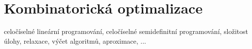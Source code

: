 \chapter{Kombinatorická optimalizace}

celočíselné lineární programování, celočíselné semidefinitní programování, složitost úlohy, relaxace, výčet algoritmů, aproximace, ...